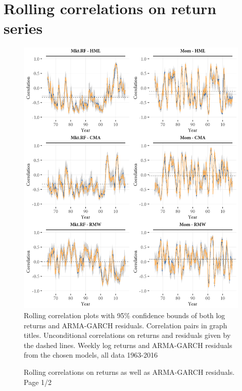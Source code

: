 \section{Rolling correlations on return series}
\label{app:rolling_return}
\begin{figure}[H]
  \caption{Rolling correlations on returns as well as ARMA-GARCH residuals. Page 1/2}
  \label{fig:appendix_rolling1}
  \centering
  \begin{minipage}{\textwidth}
  \includegraphics[scale=1]{graphics/appendix_rolling1.png}  
  \vspace{3mm}
  \footnotesize
  Rolling correlation plots with 95\% confidence bounds of both log returns and ARMA-GARCH residuals. Correlation pairs in graph titles. Unconditional correlations on returns and residuals given by the dashed lines. Weekly log returns and ARMA-GARCH residuals from the chosen models, all data 1963-2016
  \end{minipage}
\end{figure}
